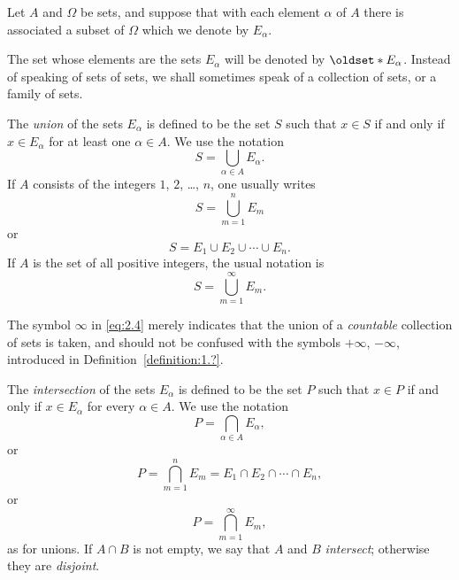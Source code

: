 \begin{definition}
    Let \(A\) and \(\Omega\) be sets, and suppose that with each element \(\alpha\) of \(A\) there is associated a subset of \(\Omega\) which we denote by \(E_\alpha\).
    
    The set whose elements are the sets \(E_\alpha\) will be denoted by \(\set{E_\alpha}\). Instead of speaking of sets of sets, we shall sometimes speak of a collection of sets, or a family of sets.
    
    The \emph{union} of the sets \(E_\alpha\) is defined to be the set \(S\) such that \(x\in S\) if and only if \(x\in E_\alpha\) for at least one \(\alpha\in A\). We use the notation
    \begin{equation}
        S=\bigcup_{\alpha\in A}E_\alpha.
    \end{equation}
    If \(A\) consists of the integers \(1\), \(2\), \ldots, \(n\), one usually writes
    \begin{equation}
        S=\bigcup_{m=1}^nE_m
    \end{equation}
    or
    \begin{equation}
        S=E_1\cup E_2\cup\cdots\cup E_n.
    \end{equation}
    If \(A\) is the set of all positive integers, the usual notation is
    \begin{equation}
        S=\bigcup_{m=1}^\infty E_m.\label{eq:2.4}
    \end{equation}

    The symbol \(\infty\) in \eqref{eq:2.4} merely indicates that the union of a \emph{countable} collection of sets is taken, and should not be confused with the symbols \(+\infty\), \(-\infty\), introduced in Definition~\ref{definition:1.?}.
    
    The \emph{intersection} of the sets \(E_\alpha\) is defined to be the set \(P\) such that \(x\in P\) if and only if \(x\in E_\alpha\) for every \(\alpha\in A\). We use the notation
    \begin{equation}
        P=\bigcap_{\alpha\in A}E_\alpha,
    \end{equation}
    or
    \begin{equation}
        P=\bigcap_{m=1}^nE_m=E_1\cap E_2\cap\cdots\cap E_n,
    \end{equation}
    or
    \begin{equation}
        P=\bigcap_{m=1}^\infty E_m,
    \end{equation}
    as for unions. If \(A\cap B\) is not empty, we say that \(A\) and \(B\) \emph{intersect}; otherwise they are \emph{disjoint}.
\end{definition}

